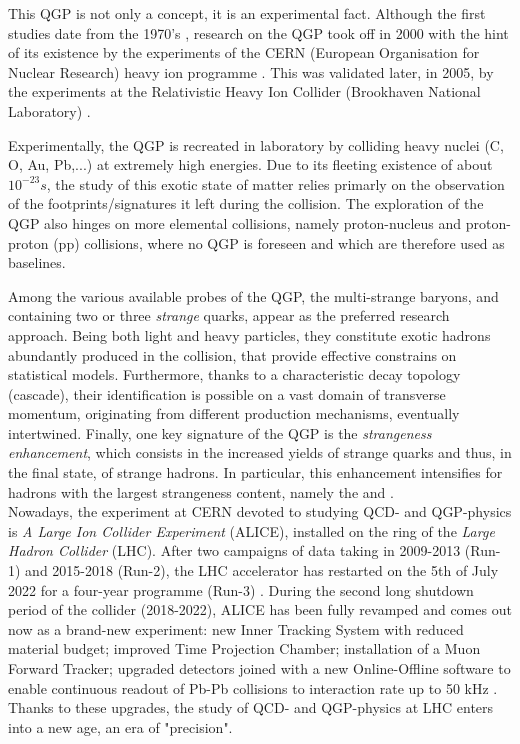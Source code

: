 This QGP is not only a concept, it is an experimental fact. Although the first studies date from the 1970's \cite{carruthersQuarkiumBizarreFermi1974}\cite{harringtonHighDensityPhaseTransitions1974}\cite{collinsSuperdenseMatterNeutrons1975}, research on the QGP took off in 2000 with the hint of its existence by the experiments of the CERN (European Organisation for Nuclear Research) heavy ion programme \cite{NewStateMatter2023}. This was validated later, in 2005, by the experiments at the Relativistic Heavy Ion Collider (Brookhaven National Laboratory) \cite{ludlamHUNTINGQUARKGLUON2005}\cite{arseneQuarkGluonPlasma2005}\cite{alPHOBOSPerspectiveDiscoveries2005}\cite{phenixcollaborationFormationDensePartonic2005} \cite{starcollaborationExperimentalTheoreticalChallenges2005}.

Experimentally, the QGP is recreated in laboratory by colliding heavy nuclei (C, O, Au, Pb,...) at extremely high energies. Due to its fleeting existence of about $10^{-23} s$, the study of this exotic state of matter relies primarly on the observation of the footprints/signatures it left during the collision. The exploration of the QGP also hinges on more elemental collisions, namely proton-nucleus and proton-proton (pp) collisions, where no QGP is foreseen and which are therefore used as baselines. 

Among the various available probes of the QGP, the multi-strange baryons, \rmXi and \rmOmega containing two or three \textit{strange} quarks, appear as the preferred research approach. Being both light and heavy particles, they constitute exotic hadrons abundantly produced in the collision, that provide effective constrains on statistical models. Furthermore, thanks to a characteristic decay topology (cascade), their identification is possible on a vast domain of transverse momentum, originating from different production mechanisms, eventually intertwined. Finally, one key signature of the QGP is the \textit{strangeness enhancement}, which consists in the increased yields of strange quarks and thus, in the final state, of strange hadrons. In particular, this enhancement intensifies for hadrons with the largest strangeness content, namely the \rmXi and \rmOmega.\\

Nowadays, the experiment at CERN devoted to studying QCD- and QGP-physics is \textit{A Large Ion Collider Experiment} (ALICE), installed on the ring of the \textit{Large Hadron Collider} (LHC). After two campaigns of data taking in 2009-2013 (Run-1) and 2015-2018 (Run-2), the LHC accelerator has restarted on the 5th of July 2022 for a four-year programme (Run-3) \cite{ThirdRunLarge2023}. During the second long shutdown period of the collider (2018-2022), ALICE has been fully revamped and comes out now as a brand-new experiment: new Inner Tracking System with reduced material budget; improved Time Projection Chamber; installation of a Muon Forward Tracker; upgraded detectors joined with a new Online-Offline software to enable continuous readout of Pb-Pb collisions to interaction rate up to 50 kHz \cite{alicecollaborationUpgradeALICEExperiment2014}. Thanks to these upgrades, the study of QCD- and QGP-physics at LHC enters into a new age, an era of "precision".

